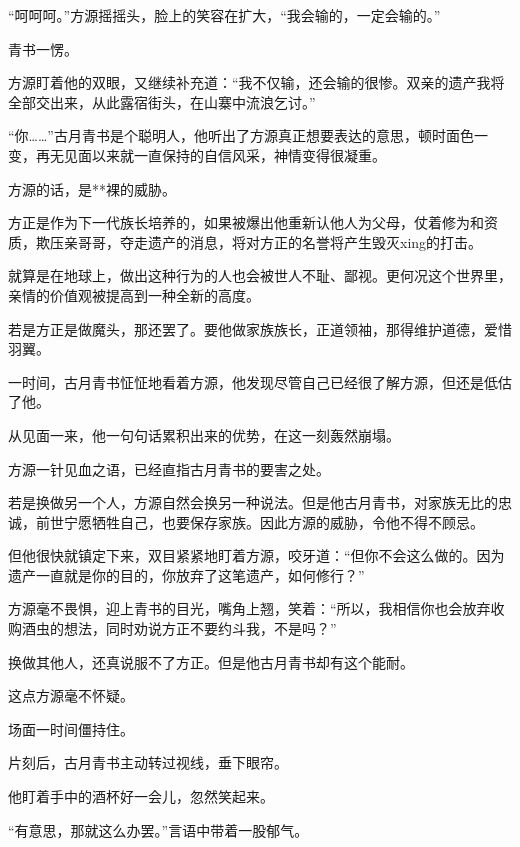 \begin{this_body}
“呵呵呵。”方源摇摇头，脸上的笑容在扩大，“我会输的，一定会输的。”

青书一愣。

方源盯着他的双眼，又继续补充道：“我不仅输，还会输的很惨。双亲的遗产我将全部交出来，从此露宿街头，在山寨中流浪乞讨。”

“你……”古月青书是个聪明人，他听出了方源真正想要表达的意思，顿时面色一变，再无见面以来就一直保持的自信风采，神情变得很凝重。

方源的话，是**裸的威胁。

方正是作为下一代族长培养的，如果被爆出他重新认他人为父母，仗着修为和资质，欺压亲哥哥，夺走遗产的消息，将对方正的名誉将产生毁灭xing的打击。

就算是在地球上，做出这种行为的人也会被世人不耻、鄙视。更何况这个世界里，亲情的价值观被提高到一种全新的高度。

若是方正是做魔头，那还罢了。要他做家族族长，正道领袖，那得维护道德，爱惜羽翼。

一时间，古月青书怔怔地看着方源，他发现尽管自己已经很了解方源，但还是低估了他。

从见面一来，他一句句话累积出来的优势，在这一刻轰然崩塌。

方源一针见血之语，已经直指古月青书的要害之处。

若是换做另一个人，方源自然会换另一种说法。但是他古月青书，对家族无比的忠诚，前世宁愿牺牲自己，也要保存家族。因此方源的威胁，令他不得不顾忌。

但他很快就镇定下来，双目紧紧地盯着方源，咬牙道：“但你不会这么做的。因为遗产一直就是你的目的，你放弃了这笔遗产，如何修行？”

方源毫不畏惧，迎上青书的目光，嘴角上翘，笑着：“所以，我相信你也会放弃收购酒虫的想法，同时劝说方正不要约斗我，不是吗？”

换做其他人，还真说服不了方正。但是他古月青书却有这个能耐。

这点方源毫不怀疑。

场面一时间僵持住。

片刻后，古月青书主动转过视线，垂下眼帘。

他盯着手中的酒杯好一会儿，忽然笑起来。

“有意思，那就这么办罢。”言语中带着一股郁气。

\end{this_body}

